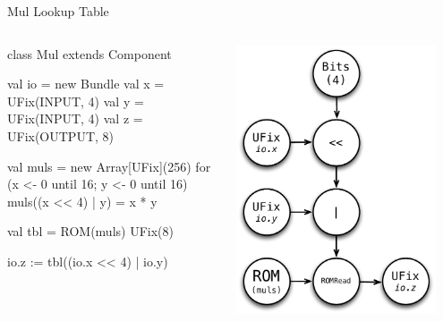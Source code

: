 \documentclass[xcolor=pdflatex,dvipsnames,table]{beamer}
\begin{document}
\begin{frame}[fragile]{Mul Lookup Table}
\begin{columns}

\begin{scala}
class Mul extends Component {
  val io = new Bundle {
    val x   = UFix(INPUT, 4)
    val y   = UFix(INPUT, 4)
    val z   = UFix(OUTPUT, 8) }

  val muls = new Array[UFix](256)
  for (x <- 0 until 16; y <- 0 until 16) 
    muls((x << 4) | y) = x * y

  val tbl = ROM(muls){ UFix(8) }

  io.z := tbl((io.x << 4) | io.y)
}
\end{scala}


\begin{center}
\includegraphics[width=0.9\textwidth]{figs/muls.pdf} 
\end{center}

\end{columns}
\end{frame}
\end{document}
